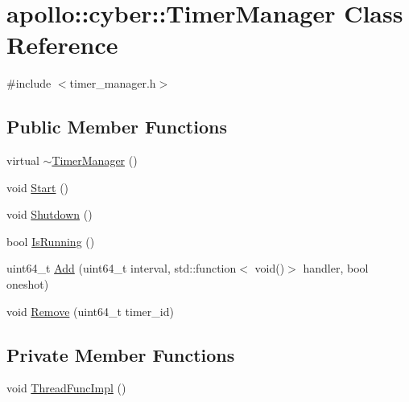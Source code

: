 \hypertarget{classapollo_1_1cyber_1_1TimerManager}{\section{apollo\-:\-:cyber\-:\-:Timer\-Manager Class Reference}
\label{classapollo_1_1cyber_1_1TimerManager}
}


{\ttfamily \#include $<$timer\-\_\-manager.\-h$>$}

\subsection*{Public Member Functions}
\begin{DoxyCompactItemize}
\item 
virtual \hyperlink{classapollo_1_1cyber_1_1TimerManager_a7c24c08a81c56e17af7de3f659ada622}{$\sim$\-Timer\-Manager} ()
\item 
void \hyperlink{classapollo_1_1cyber_1_1TimerManager_a3b12ca83b1b0fcfe1247a1d46d922a3f}{Start} ()
\item 
void \hyperlink{classapollo_1_1cyber_1_1TimerManager_a5f6375a4c10e451707198d193f98ba1b}{Shutdown} ()
\item 
bool \hyperlink{classapollo_1_1cyber_1_1TimerManager_ab179408a45f0ad08c6405b05af897941}{Is\-Running} ()
\item 
uint64\-\_\-t \hyperlink{classapollo_1_1cyber_1_1TimerManager_aefcab6d469d9f0f4eb4420a3df73df44}{Add} (uint64\-\_\-t interval, std\-::function$<$ void()$>$ handler, bool oneshot)
\item 
void \hyperlink{classapollo_1_1cyber_1_1TimerManager_a76046da749392382bb30b90a98d7f5eb}{Remove} (uint64\-\_\-t timer\-\_\-id)
\end{DoxyCompactItemize}
\subsection*{Private Member Functions}
\begin{DoxyCompactItemize}
\item 
void \hyperlink{classapollo_1_1cyber_1_1TimerManager_a8492669c4feb18223792ab5878eb9fa2}{Thread\-Func\-Impl} ()
\end{DoxyCompactItemize}
